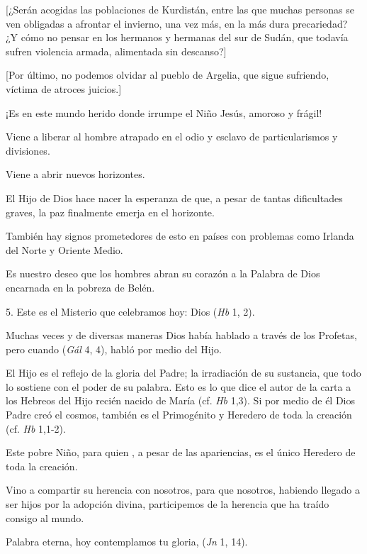 \begin{body}
\begin{body}
		{[}¿Serán acogidas las poblaciones de Kurdistán, entre las que muchas personas se ven obligadas a afrontar el invierno, una vez más, en la más dura precariedad? ¿Y cómo no pensar en los hermanos y hermanas del sur de Sudán, que todavía sufren violencia armada, alimentada sin descanso?{]}

		{[}Por último, no podemos olvidar al pueblo de Argelia, que sigue sufriendo, víctima de atroces juicios.{]}

		¡Es en este mundo herido donde irrumpe el Niño Jesús, amoroso y frágil!

		Viene a liberar al hombre atrapado en el odio y esclavo de particularismos y divisiones.

		Viene a abrir nuevos horizontes.

		El Hijo de Dios hace nacer la esperanza de que, a pesar de tantas dificultades graves, la paz finalmente emerja en el horizonte.

		También hay signos prometedores de esto en países con problemas como Irlanda del Norte y Oriente Medio.

		Es nuestro deseo que los hombres abran su corazón a la Palabra de Dios encarnada en la pobreza de Belén.

		5. Este es el Misterio que celebramos hoy: Dios  (\emph{Hb} 1, 2).

		Muchas veces y de diversas maneras Dios había hablado a través de los Profetas, pero cuando  (\emph{Gál} 4, 4), habló por medio del Hijo.

		El Hijo es el reflejo de la gloria del Padre; la irradiación de su sustancia, que todo lo sostiene con el poder de su palabra. Esto es lo que dice el autor de la carta a los Hebreos del Hijo recién nacido de María (cf. \emph{Hb} 1,3). Si por medio de él Dios Padre creó el cosmos, también es el Primogénito y Heredero de toda la creación (cf. \emph{Hb} 1,1-2).

		Este pobre Niño, para quien , a pesar de las apariencias, es el único Heredero de toda la creación.

		Vino a compartir su herencia con nosotros, para que nosotros, habiendo llegado a ser hijos por la adopción divina, participemos de la herencia que ha traído consigo al mundo.

		Palabra eterna, hoy contemplamos tu gloria,  (\emph{Jn} 1, 14).


\end{body}
\end{body}
